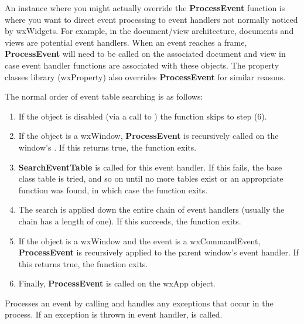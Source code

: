 An instance where you might actually override the {\bf ProcessEvent} function is where you want
to direct event processing to event handlers not normally noticed by wxWidgets. For example,
in the document/view architecture, documents and views are potential event handlers.
When an event reaches a frame, {\bf ProcessEvent} will need to be called on the associated
document and view in case event handler functions are associated with these objects.
The property classes library (wxProperty) also overrides {\bf ProcessEvent} for similar reasons.

The normal order of event table searching is as follows:

\begin{enumerate}\itemsep=0pt
\item If the object is disabled (via a call to )
the function skips to step (6).
\item If the object is a wxWindow, {\bf ProcessEvent} is recursively called on the window's\rtfsp
{}. If this returns true, the function exits.
\item {\bf SearchEventTable} is called for this event handler. If this fails, the base
class table is tried, and so on until no more tables exist or an appropriate function was found,
in which case the function exits.
\item The search is applied down the entire chain of event handlers (usually the chain has a length
of one). If this succeeds, the function exits.
\item If the object is a wxWindow and the event is a wxCommandEvent, {\bf ProcessEvent} is
recursively applied to the parent window's event handler. If this returns true, the function exits.
\item Finally, {\bf ProcessEvent} is called on the wxApp object.
\end{enumerate}




\label{wxevthandlersafelyprocessevent}


Processes an event by calling 
and handles any exceptions that occur in the process. If an exception is
thrown in event handler, 
is called.

